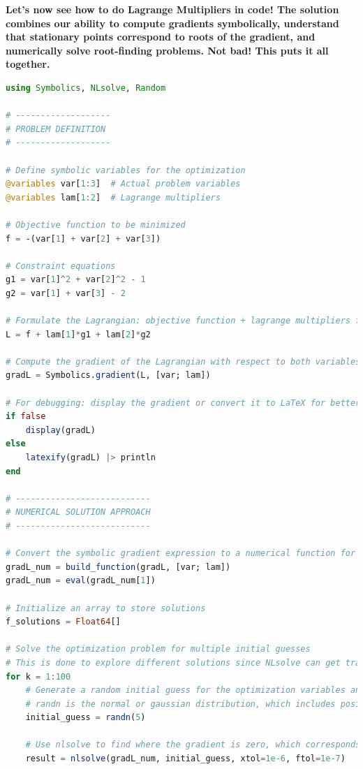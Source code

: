 \Qed

\bigskip

\textbf{Let's now see how to do Lagrange Multipliers in code! The solution combines our ability to compute gradients symbolically, understand that stationary points correspond to roots of the gradient, and numerically solve root-finding problems. Not bad! This puts it all together. }

\bigskip

\begin{lstlisting}[language=Julia,style=mystyle]
using Symbolics, NLsolve, Random

# -------------------
# PROBLEM DEFINITION
# -------------------

# Define symbolic variables for the optimization
@variables var[1:3]  # Actual problem variables
@variables lam[1:2]  # Lagrange multipliers

# Objective function to be minimized
f = -(var[1] + var[2] + var[3])

# Constraint equations
g1 = var[1]^2 + var[2]^2 - 1
g2 = var[1] + var[3] - 2

# Formulate the Lagrangian: objective function + lagrange multipliers for constraints
L = f + lam[1]*g1 + lam[2]*g2

# Compute the gradient of the Lagrangian with respect to both variables and Lagrange multipliers
gradL = Symbolics.gradient(L, [var; lam])

# For debugging: display the gradient or convert it to LaTeX for better visualization
if false 
    display(gradL)
else
    latexify(gradL) |> println
end

# ---------------------------
# NUMERICAL SOLUTION APPROACH
# ---------------------------

# Convert the symbolic gradient expression to a numerical function for computational efficiency
gradL_num = build_function(gradL, [var; lam])
gradL_num = eval(gradL_num[1])

# Initialize an array to store solutions
f_solutions = Float64[]

# Solve the optimization problem for multiple initial guesses
# This is done to explore different solutions since NLsolve can get trapped in local minima
for k = 1:100
    # Generate a random initial guess for the optimization variables and Lagrange multipliers
    # randn is the normal or gaussian distribution, which includes positive and negative values
    initial_guess = randn(5)

    # Use nlsolve to find where the gradient is zero, which corresponds to an extremum
    result = nlsolve(gradL_num, initial_guess, xtol=1e-6, ftol=1e-7)



\end{lstlisting}

